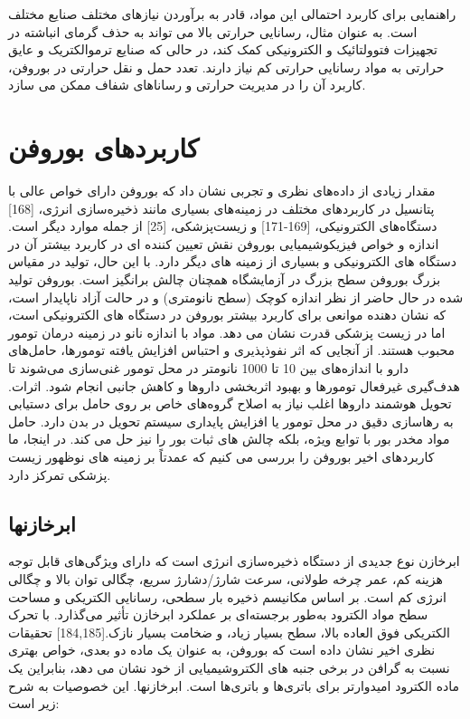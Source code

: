 راهنمایی برای کاربرد احتمالی این مواد، قادر به برآوردن نیازهای مختلف صنایع مختلف است. به عنوان مثال، رسانایی حرارتی بالا می تواند به حذف گرمای انباشته در تجهیزات فتوولتائیک و الکترونیکی کمک کند، در حالی که صنایع ترموالکتریک و عایق حرارتی به مواد رسانایی حرارتی کم نیاز دارند. تعدد حمل و نقل حرارتی در بوروفن، کاربرد آن را در مدیریت حرارتی و رساناهای شفاف ممکن می سازد.
\section{کاربردهای بوروفن}
مقدار زیادی از داده‌های نظری و تجربی نشان داد که بوروفن دارای خواص عالی با پتانسیل در کاربردهای مختلف در زمینه‌های بسیاری مانند ذخیره‌سازی انرژی، \cite{raoUltrahighEnergyStorage2017}[168] دستگاه‌های الکترونیکی، \cite{pengTuningElectronicStructure2016, mortazaviBoropheneAnodeMaterial2016}[169-171] و زیست‌پزشکی، \cite{jiNovelTopDownSynthesis2018}[25] از جمله موارد دیگر است. اندازه و خواص فیزیکوشیمیایی بوروفن نقش تعیین کننده ای در کاربرد بیشتر آن در دستگاه های الکترونیکی و بسیاری از زمینه های دیگر دارد. با این حال، تولید در مقیاس بزرگ بوروفن سطح بزرگ در آزمایشگاه همچنان چالش برانگیز است. بوروفن تولید شده در حال حاضر از نظر اندازه کوچک (سطح نانومتری) و در حالت آزاد ناپایدار است، که نشان دهنده موانعی برای کاربرد بیشتر بوروفن در دستگاه های الکترونیکی است، اما در زیست پزشکی قدرت نشان می دهد. مواد با اندازه نانو در زمینه درمان تومور محبوب هستند. از آنجایی که اثر نفوذپذیری و احتباس  افزایش یافته تومورها، حامل‌های دارو با اندازه‌های بین 10 تا 1000 نانومتر در محل تومور غنی‌سازی می‌شوند تا هدف‌گیری غیرفعال تومورها و بهبود اثربخشی داروها و کاهش جانبی انجام شود. اثرات. تحویل هوشمند داروها اغلب نیاز به اصلاح گروه‌های خاص بر روی حامل برای دستیابی به رهاسازی دقیق در محل تومور یا افزایش پایداری سیستم تحویل در بدن دارد. حامل مواد مخدر بور با توابع ویژه، بلکه چالش های ثبات بور را نیز حل می کند. در اینجا، ما کاربردهای اخیر بوروفن را بررسی می کنیم که عمدتاً بر زمینه های نوظهور زیست پزشکی تمرکز دارد.
\subsection{ابرخازنها}
ابرخازن نوع جدیدی از دستگاه ذخیره‌سازی انرژی است که دارای ویژگی‌های قابل توجه هزینه کم، عمر چرخه طولانی، سرعت شارژ/دشارژ سریع، چگالی توان بالا و چگالی انرژی کم است. بر اساس مکانیسم ذخیره بار سطحی، رسانایی الکتریکی و مساحت سطح مواد الکترود به‌طور برجسته‌ای بر عملکرد ابرخازن تأثیر می‌گذارد. با تحرک الکتریکی فوق العاده بالا، سطح بسیار زیاد، و ضخامت بسیار نازک.\cite{zhangBoropheneExtremelyHigh2016, zhanBoronSupercapacitors2016}[184,185] تحقیقات نظری اخیر نشان داده است که بوروفن، به عنوان یک ماده دو بعدی، خواص بهتری نسبت به گرافن در برخی جنبه های الکتروشیمیایی از خود نشان می دهد، بنابراین یک ماده الکترود امیدوارتر برای باتری‌ها و باتری‌ها است. ابرخازنها. این خصوصیات به شرح زیر است: 

